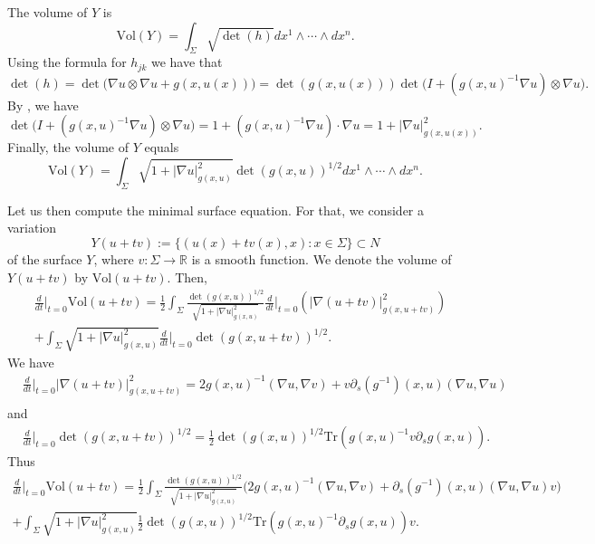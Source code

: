 \documentclass[12pt]{amsart}
\def\p{\partial}
\def\R{\mathbb R}
\theoremstyle{definition}
\theoremstyle{remark}
\newcommand{\abs}[1]{\lvert #1 \rvert}
\begin{document}
The volume of $Y$ is 
\[
 \text{Vol}(Y)=\int_\Sigma \sqrt{\det(h)}dx^1\wedge\cdots \wedge dx^n.
\]
Using the formula for $h_{jk}$ we have that
\[
 \det(h)=\det\Big(\nabla u\otimes \nabla u +g(x,u(x))\Big)=\det(g(x,u(x)))\det\Big(I+(g(x,u)^{-1}\nabla u)\otimes \nabla u\Big).
\]
By \cite[Lemma 1.1]{Ding}, we have 
\[
 \det\Big(I+(g(x,u)^{-1}\nabla u)\otimes \nabla u\Big)=1+(g(x,u)^{-1}\nabla u) \cdot \nabla u=1+\abs{\nabla u}_{g(x,u(x))}^2.
\]
Finally, the volume of $Y$ equals
\[
 \text{Vol}(Y)=\int_\Sigma \sqrt{1+\abs{\nabla u}^2_{g(x,u)}}\det(g(x,u))^{1/2}dx^1\wedge\cdots \wedge dx^n.
\]

Let us then compute the minimal surface equation. For that, we consider a variation
\[
 Y(u+tv):=\{(u(x)+tv(x),x): x\in \Sigma\} \subset N
\]
of the surface $Y$, where $v:\Sigma \to \R$ is a smooth function. We denote the volume of $Y(u+tv)$ by $\text{Vol}(u+tv)$. Then, 
\begin{align*}
 &\frac{d}{dt}\Big|_{t=0}\text{Vol}(u+tv)=\frac 12 \int_\Sigma \frac{\det(g(x,u))^{1/2}}{\sqrt{1+\abs{\nabla u}^2_{g(x,u)}}}\frac{d}{dt}\Big|_{t=0}\left(\abs{\nabla (u+tv)}^2_{g(x,u+tv)}\right) \\
 &+\int_\Sigma \sqrt{1+\abs{\nabla u}^2_{g(x,u)}} \frac{d}{dt}\Big|_{t=0}\det(g(x,u+tv))^{1/2}.
\end{align*}
We have
\begin{align*}
 &\frac{d}{dt}\Big|_{t=0}\abs{\nabla (u+tv)}^2_{g(x,u+tv)}=2g(x,u)^{-1}(\nabla u, \nabla v)+v\p_s(g^{-1})(x,u)(\nabla u,\nabla u) \\
\end{align*}
and
\begin{align*}
 &\frac{d}{dt}\Big|_{t=0}\det(g(x,u+tv))^{1/2}=\frac{1}{2}\det(g(x,u))^{1/2}\text{Tr}(g(x,u)^{-1}v\p_sg(x,u)).
\end{align*}
Thus
\begin{multline}\label{eq:first_var}
 \frac{d}{dt}\Big|_{t=0}\text{Vol}(u+tv)=\frac 12 \int_\Sigma \frac{\det(g(x,u))^{1/2}}{\sqrt{1+\abs{\nabla u}^2_{g(x,u)}}}\Big(2g(x,u)^{-1}(\nabla u, \nabla v)+\p_s(g^{-1})(x,u)(\nabla u,\nabla u)v\Big) \\
 +\int_\Sigma \sqrt{1+\abs{\nabla u}^2_{g(x,u)}}\frac{1}{2}\det(g(x,u))^{1/2}\text{Tr}(g(x,u)^{-1}\p_sg(x,u))v.
\end{multline}
\end{document}
